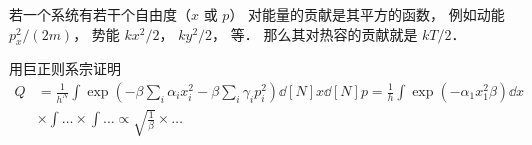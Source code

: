 
若一个系统有若干个自由度（$x$ 或 $p$） 对能量的贡献是其平方的函数， 例如动能 $p_x^2/(2m)$， 势能 $kx^2/2$， $ky^2/2$， 等． 那么其对热容的贡献就是 $kT/2$．

用巨正则系宗证明
\begin{equation}
\begin{aligned}
Q &= \frac{1}{h^N} \int \exp(-\beta \sum_i \alpha_i x_i^2 - \beta \sum_i \gamma_i p_i^2) \dd[N]{x} \dd[N]{p} = \frac{1}{h} \int \exp(-\alpha_1 x_1^2 \beta) \dd{x}\\
& \times \int \dots \times \int \dots \propto \sqrt{\frac{1}{\beta}} \times \dots
\end{aligned}
\end{equation}
